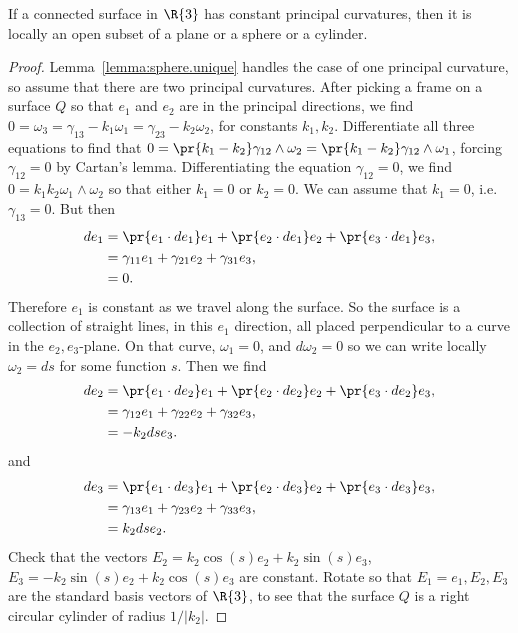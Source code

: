 \begin{lemma}
If a connected surface in \(\R{3}\) has constant principal curvatures, then it is locally an open subset of a plane or a sphere or a cylinder.
\end{lemma}
\begin{proof}
Lemma~\vref{lemma:sphere.unique} handles the case of one principal curvature, so assume that there are two principal curvatures.
After picking a frame on a surface \(Q\) so that \(e_1\) and \(e_2\) are in the principal directions, we find \(0=\omega_3=\gamma_{13}-k_1 \omega_1=\gamma_{23}-k_2 \omega_2\), for constants \(k_1, k_2\).
Differentiate all three equations to find that \(0=\pr{k_1-k_2}\gamma_{12} \wedge \omega_2=\pr{k_1-k_2} \gamma_{12} \wedge \omega_1\), forcing \(\gamma_{12}=0\) by Cartan's lemma.
Differentiating the equation \(\gamma_{12}=0\), we find \(0=k_1 k_2 \omega_1 \wedge \omega_2\) so that either \(k_1=0\) or \(k_2=0\).
We can assume that \(k_1=0\), i.e. \(\gamma_{13}=0\).
But then 
\begin{align*}
de_1
&=
\pr{e_1 \cdot de_1} e_1 +
\pr{e_2 \cdot de_1} e_2 +
\pr{e_3 \cdot de_1} e_3,
\\
&=
\gamma_{11} e_1 +
\gamma_{21} e_2 +
\gamma_{31} e_3,
\\
&=
0.
\end{align*}
Therefore \(e_1\) is constant as we travel along the surface.
So the surface is a collection of straight lines, in this \(e_1\) direction, all placed perpendicular to a curve in the \(e_2, e_3\)-plane.
On that curve, \(\omega_1=0\), and \(d \omega_2=0\) so we can write locally \(\omega_2=ds\) for some function \(s\).
Then we find 
\begin{align*}
de_2
&=
\pr{e_1 \cdot de_2} e_1 +
\pr{e_2 \cdot de_2} e_2 +
\pr{e_3 \cdot de_2} e_3,
\\
&=
\gamma_{12} e_1 +
\gamma_{22} e_2 +
\gamma_{32} e_3,
\\
&=
-k_2 ds e_3.
\end{align*}
and
\begin{align*}
de_3
&=
\pr{e_1 \cdot de_3} e_1 +
\pr{e_2 \cdot de_3} e_2 +
\pr{e_3 \cdot de_3} e_3,
\\
&=
\gamma_{13} e_1 +
\gamma_{23} e_2 +
\gamma_{33} e_3,
\\
&=
k_2 ds e_2.
\end{align*}
Check that the vectors \(E_2 = k_2 \cos(s) e_2 + k_2 \sin(s) e_3\), \(E_3 = -k_2 \sin(s) e_2 + k_2 \cos(s) e_3\) are constant.
Rotate so that \(E_1=e_1, E_2, E_3\) are the standard basis vectors of \(\R{3}\), to see that the surface \(Q\) is a right circular cylinder of radius \(1/\left|k_2\right|\).
\end{proof}



